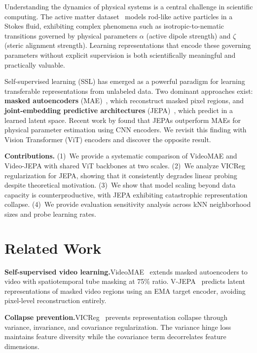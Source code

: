 \documentclass{article}
\begin{document}
Understanding the dynamics of physical systems is a central challenge in scientific computing. The active matter dataset~\cite{ohana2024well} models rod-like active particles in a Stokes fluid, exhibiting complex phenomena such as isotropic-to-nematic transitions governed by physical parameters $\alpha$ (active dipole strength) and $\zeta$ (steric alignment strength). Learning representations that encode these governing parameters without explicit supervision is both scientifically meaningful and practically valuable.

Self-supervised learning (SSL) has emerged as a powerful paradigm for learning transferable representations from unlabeled data. Two dominant approaches exist: \textbf{masked autoencoders} (MAE)~\cite{he2022masked, tong2022videomae}, which reconstruct masked pixel regions, and \textbf{joint-embedding predictive architectures} (JEPA)~\cite{assran2023self, bardes2024revisiting}, which predict in a learned latent space. Recent work by \citet{qu2025representation} found that JEPAs outperform MAEs for physical parameter estimation using CNN encoders. We revisit this finding with Vision Transformer (ViT) encoders and discover the opposite result.

\textbf{Contributions.} (1)~We provide a systematic comparison of VideoMAE and Video-JEPA with shared ViT backbones at two scales. (2)~We analyze VICReg regularization for JEPA, showing that it consistently degrades linear probing despite theoretical motivation. (3)~We show that model scaling beyond data capacity is counterproductive, with JEPA exhibiting catastrophic representation collapse. (4)~We provide evaluation sensitivity analysis across kNN neighborhood sizes and probe learning rates.

\section{Related Work}

\textbf{Self-supervised video learning.}\quad VideoMAE~\cite{tong2022videomae} extends masked autoencoders to video with spatiotemporal tube masking at 75\% ratio. V-JEPA~\cite{bardes2024revisiting} predicts latent representations of masked video regions using an EMA target encoder, avoiding pixel-level reconstruction entirely.

\textbf{Collapse prevention.}\quad VICReg~\cite{bardes2021vicreg} prevents representation collapse through variance, invariance, and covariance regularization. The variance hinge loss maintains feature diversity while the covariance term decorrelates feature dimensions.
\end{document}
